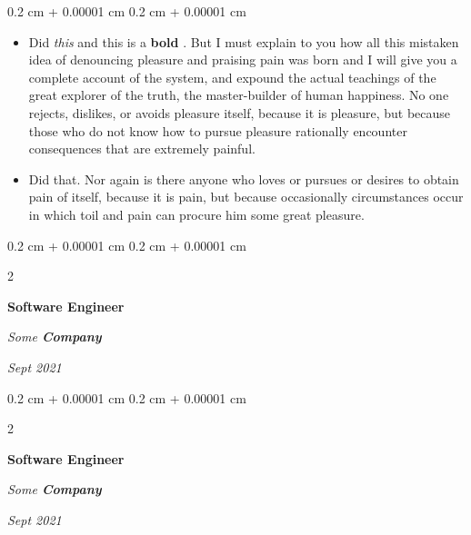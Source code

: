 \documentclass[10pt, letterpaper]{article}
\newenvironment{highlights}{
    \begin{itemize}[
        topsep=0.10 cm,
        parsep=0.10 cm,
        partopsep=0pt,
        itemsep=0pt,
        leftmargin=0.4 cm + 10pt
    ]
}{
    \end{itemize}
} %
\newenvironment{onecolentry}{
    \begin{adjustwidth}{
        0.2 cm + 0.00001 cm
    }{
        0.2 cm + 0.00001 cm
    }
}{
    \end{adjustwidth}
} %
\newenvironment{twocolentry}[2][]{
    \onecolentry
    \def\secondColumn{#2}
    \setcolumnwidth{\fill, 4.5 cm}
    \begin{paracol}{2}
}{
    \switchcolumn \raggedleft \secondColumn
    \end{paracol}
    \endonecolentry
} %
\let\hrefWithoutArrow\href
\renewcommand{\href}[2]{\hrefWithoutArrow{#1}{\ifthenelse{\equal{#2}{}}{ }{#2 }\raisebox{.15ex}{\footnotesize \faExternalLink*}}}
\begin{document}
        \vspace{0.10 cm}
        \begin{onecolentry}
            \begin{highlights}
                \item Did \textit{this} and this is a \textbf{bold} \href{https://example.com}{link}. But I must explain to you how all this mistaken idea of denouncing pleasure and praising pain was born and I will give you a complete account of the system, and expound the actual teachings of the great explorer of the truth, the master-builder of human happiness. No one rejects, dislikes, or avoids pleasure itself, because it is pleasure, but because those who do not know how to pursue pleasure rationally encounter consequences that are extremely painful.
                \item Did that. Nor again is there anyone who loves or pursues or desires to obtain pain of itself, because it is pain, but because occasionally circumstances occur in which toil and pain can procure him some great pleasure.
            \end{highlights}
        \end{onecolentry}


        \vspace{0.2 cm}

        \begin{twocolentry}{
            
            
        \textit{Sept 2021}}
            \textbf{Software Engineer}
            
            \textit{Some \textbf{Company}}
        \end{twocolentry}



        \vspace{0.2 cm}

        \begin{twocolentry}{
            
            
        \textit{Sept 2021}}
            \textbf{Software Engineer}
            
            \textit{Some \textbf{Company}}
        \end{twocolentry}
\end{document}
